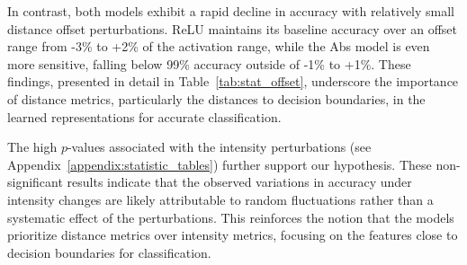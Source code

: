 In contrast, both models exhibit a rapid decline in accuracy with relatively small distance offset perturbations. ReLU maintains its baseline accuracy over an offset range from -3\% to +2\% of the activation range, while the Abs model is even more sensitive, falling below 99\% accuracy outside of -1\% to +1\%. These findings, presented in detail in Table~\ref{tab:stat_offset}, underscore the importance of distance metrics, particularly the distances to decision boundaries, in the learned representations for accurate classification.

The high $p$-values associated with the intensity perturbations (see Appendix~\ref{appendix:statistic_tables}) further support our hypothesis. These non-significant results indicate that the observed variations in accuracy under intensity changes are likely attributable to random fluctuations rather than a systematic effect of the perturbations. This reinforces the notion that the models prioritize distance metrics over intensity metrics, focusing on the features close to decision boundaries for classification.
